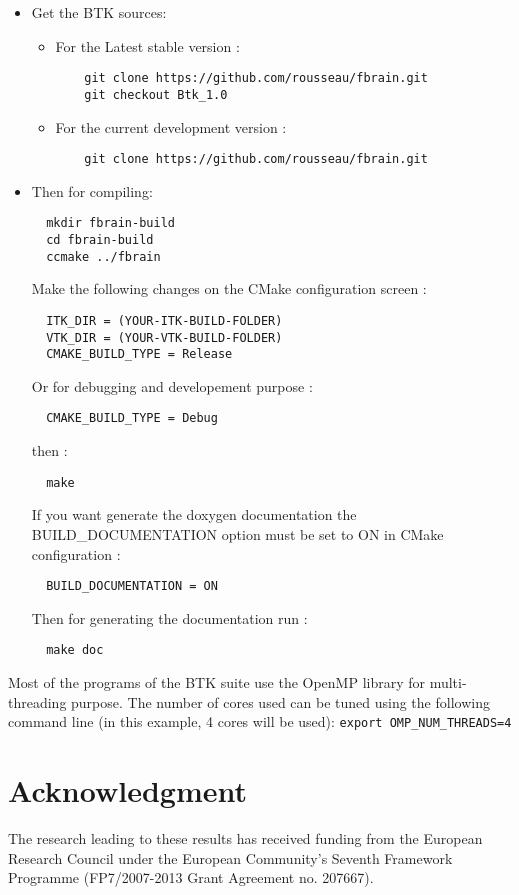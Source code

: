 \documentclass[a4paper,10pt]{article}
\begin{document}
  \begin{itemize}
  \item Get the BTK sources:
    \begin{itemize}
    \item For the Latest stable version :
    \begin{verbatim}
    git clone https://github.com/rousseau/fbrain.git
    git checkout Btk_1.0 
    \end{verbatim}
    \item For the current development version :
    \begin{verbatim}
    git clone https://github.com/rousseau/fbrain.git
    \end{verbatim}  
    \end{itemize}
  \item Then for compiling:
  \begin{verbatim}
  mkdir fbrain-build
  cd fbrain-build
  ccmake ../fbrain
  \end{verbatim}
  Make the following changes on the CMake configuration screen :
  \begin{verbatim}
  ITK_DIR = (YOUR-ITK-BUILD-FOLDER)
  VTK_DIR = (YOUR-VTK-BUILD-FOLDER)
  CMAKE_BUILD_TYPE = Release
  \end{verbatim}
  Or for debugging and developement purpose :
  \begin{verbatim}
  CMAKE_BUILD_TYPE = Debug
  \end{verbatim}
  then :
  \begin{verbatim}
  make
  \end{verbatim}

  If you want generate the doxygen documentation the BUILD\_DOCUMENTATION option must be set to ON in CMake configuration :
  \begin{verbatim}
  BUILD_DOCUMENTATION = ON
  \end{verbatim}
  Then for generating the documentation run :
  \begin{verbatim}
  make doc
  \end{verbatim}

  \end{itemize}

  Most of the programs of the BTK suite use the OpenMP library for multi-threading
  purpose. The number of cores used can be tuned using the following command line
  (in this example, 4 cores will be used): \texttt{export OMP\_NUM\_THREADS=4}


  


  \section*{Acknowledgment}
  \small{The research leading to these results has received funding from the
  European Research Council under the European Community’s Seventh Framework
  Programme (FP7/2007-2013 Grant Agreement no. 207667).}


  
\end{document}
